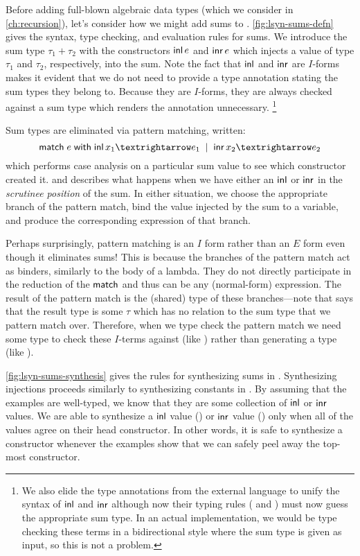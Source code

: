 Before adding full-blown algebraic data types (which we consider in \autoref{ch:recursion}), let's consider how we might add sums to \lsyn{}.
\autoref{fig:lsyn-sums-defn} gives the syntax, type checking, and evaluation rules for sums.
We introduce the sum type $τ_1 + τ_2$ with the constructors $\minl{e}$ and $\minr{e}$ which injects a value of type $τ_1$ and $τ_2$, respectively, into the sum.
Note the fact that $\minl{\!}$ and $\minr{\!}$ are $I$-forms makes it evident that we do not need to provide a type annotation stating the sum types they belong to.
Because they are $I$-forms, they are always checked against a sum type which renders the annotation unnecessary.%
\footnote{%
  We also elide the type annotations from the external language to unify the syntax of $\minl{\!}$ and $\minr{\!}$ although now their typing rules ( and ) must now guess the appropriate sum type.
  In an actual implementation, we would be type checking these terms in a bidirectional style where the sum type is given as input, so this is not a problem.
}

Sum types are eliminated via pattern matching, written:
\[
  \mmatch\;e\;\mwith\;\minl{x_1} → e_1 \bnfalt \minr{x_2} → e_2
\]
which performs case analysis on a particular sum value to see which constructor created it.
 and  describes what happens when we have either an $\minl{\!}$ or $\minr{\!}$ in the \emph{scrutinee position} of the sum.
In either situation, we choose the appropriate branch of the pattern match, bind the value injected by the sum to a variable, and produce the corresponding expression of that branch.

Perhaps surprisingly, pattern matching is an $I$ form rather than an $E$ form even though it eliminates sums!
This is because the branches of the pattern match act as binders, similarly to the body of a lambda.
They do not directly participate in the reduction of the $\mathsf{match}$ and thus can be any (normal-form) expression.
The result of the pattern match is the (shared) type of these branches---note that  says that the result type is some $τ$ which has no relation to the sum type that we pattern match over.
Therefore, when we type check the pattern match we need some type to check these $I$-terms against (like ) rather than generating a type (like ).



\autoref{fig:lsyn-sums-synthesis} gives the rules for synthesizing sums in \lsyn{}.
Synthesizing injections proceeds similarly to synthesizing constants in \lsyn{}.
By assuming that the examples are well-typed, we know that they are some collection of $\minl{\!}$ or $\minr{\!}$ values.
We are able to synthesize a $\minl{\!}$ value () or $\minr{\!}$ value () only when all of the values agree on their head constructor.
In other words, it is safe to synthesize a constructor whenever the examples show that we can safely peel away the top-most constructor.


